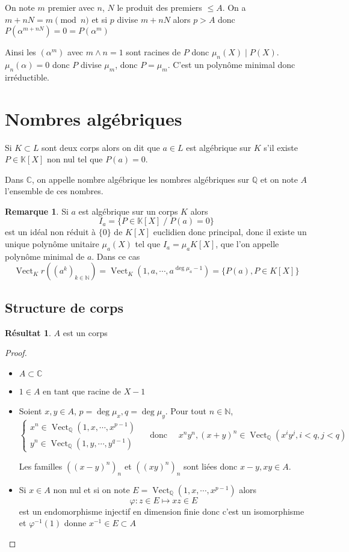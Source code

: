 \documentclass{article}
\theoremstyle{definition}
\newtheorem*{rem}{Remarque}
\newtheorem*{res}{Résultat}
\DeclareMathOperator{\Vect}{Vect}
\begin{document}
On note $m$ premier avec $n$, $N$ le produit des premiers $\leq A$. On a $m+nN=m\pmod n$ et si $p$ divise $m+nN$ alors $p>A$ donc $P(\alpha^{m+nN})=0=P(\alpha^m)$

Ainsi les $(\alpha^{m})$ avec $m\land n=1$ sont racines de $P$ donc $\mu_n(X) \;|\; P(X)$. $\mu_n(\alpha)=0$ donc $P$ divise $\mu_m$, donc $P=\mu_m$. C'est un polynôme minimal donc irréductible.

\section{Nombres algébriques}

Si $K\subset L$ sont deux corps alors on dit que $a\in L$ est algébrique sur $K$ s'il existe $P\in\mathbb K[X]$ non nul tel que $P(a)=0$.

Dans $\mathbb C$, on appelle nombre algébrique les nombres algébriques sur $\mathbb Q$ et on note $A$ l'ensemble de ces nombres.

\begin{rem}
Si $a$ est algébrique sur un corps $K$ alors \[
    I_a=\{P\in\mathbb K[X]\;/\; P(a)=0\}
\]
est un idéal non réduit à $\{0\}$ de $K[X]$ euclidien donc principal, donc il existe un unique polynôme unitaire $\mu_a(X)$ tel que $I_a=\mu_a K[X]$, que l'on appelle polynôme minimal de $a$. Dans ce cas \[
    \Vect_Kr((a^k)_{k\in\mathbb N})=\Vect_K(1, a, \cdots, a^{\deg \mu_a-1})=\{P(a), P\in K[X]\}
\]
\end{rem}

\subsection{Structure de corps}

\begin{res}
$A$ est un corps
\end{res}

\begin{proof}
\begin{itemize}
    \item $A\subset \mathbb C$
    \item $1\in A$ en tant que racine de $X-1$
    \item Soient $x, y\in A$, $p=\deg \mu_x, q=\deg \mu_y$. Pour tout $n\in\mathbb N$, \[
        \begin{cases}
            x^n\in\Vect_{\mathbb Q}(1, x, \cdots, x^{p-1}) \\ y^n\in\Vect_{\mathbb Q}(1, y, \cdots, y^{q-1})
        \end{cases}\quad\text{ donc }\quad  x^ny^n, (x+y)^n\in\Vect_{\mathbb Q}(x^iy^j, i<q, j<q)
    \]

    Les familles $((x-y)^n)_n$ et $((xy)^n)_n$ sont liées donc $x-y, xy\in A$.
    \item Si $x\in A$ non nul et si on note $E=\Vect_{\mathbb Q}(1, x, \cdots, x^{p-1})$ alors \[
        \varphi: z\in E\longmapsto xz\in E
    \]
    est un endomorphisme injectif en dimension finie donc c'est un isomorphisme et $\varphi^{-1}(1)$ donne $x^{-1}\in E\subset A$
\end{itemize}
\end{proof}
\end{document}
